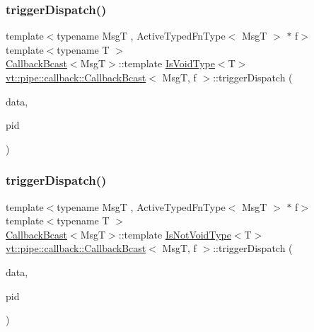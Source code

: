 \subsubsection{\texorpdfstring{trigger\+Dispatch()}{triggerDispatch()}\hspace{0.1cm}{\footnotesize\ttfamily [1/2]}}
{\footnotesize\ttfamily template$<$typename MsgT , Active\+Typed\+Fn\+Type$<$ Msg\+T $>$ $\ast$ f$>$ \\
template$<$typename T $>$ \\
\hyperlink{structvt_1_1pipe_1_1callback_1_1_callback_bcast}{Callback\+Bcast}$<$MsgT$>$\+::template \hyperlink{structvt_1_1pipe_1_1callback_1_1_callback_bcast_a3ca08c23824cfac76b837311a1d2c929}{Is\+Void\+Type}$<$T$>$ \hyperlink{structvt_1_1pipe_1_1callback_1_1_callback_bcast}{vt\+::pipe\+::callback\+::\+Callback\+Bcast}$<$ MsgT, f $>$\+::trigger\+Dispatch (\begin{DoxyParamCaption}\item[{\hyperlink{structvt_1_1pipe_1_1callback_1_1_callback_bcast_aaf994b71056001334d30d74fa9c958f9}{Signal\+Data\+Type} $\ast$}]{data,  }\item[{\hyperlink{namespacevt_ac9852acda74d1896f48f406cd72c7bd3}{Pipe\+Type} const \&}]{pid }\end{DoxyParamCaption})}

\mbox{\label{structvt_1_1pipe_1_1callback_1_1_callback_bcast_aad21dba24d76c98715a077f8e2b885ff}} 
\subsubsection{\texorpdfstring{trigger\+Dispatch()}{triggerDispatch()}\hspace{0.1cm}{\footnotesize\ttfamily [2/2]}}
{\footnotesize\ttfamily template$<$typename MsgT , Active\+Typed\+Fn\+Type$<$ Msg\+T $>$ $\ast$ f$>$ \\
template$<$typename T $>$ \\
\hyperlink{structvt_1_1pipe_1_1callback_1_1_callback_bcast}{Callback\+Bcast}$<$MsgT$>$\+::template \hyperlink{structvt_1_1pipe_1_1callback_1_1_callback_bcast_a3f5efa2edf7f4c47fe047e086e63a477}{Is\+Not\+Void\+Type}$<$T$>$ \hyperlink{structvt_1_1pipe_1_1callback_1_1_callback_bcast}{vt\+::pipe\+::callback\+::\+Callback\+Bcast}$<$ MsgT, f $>$\+::trigger\+Dispatch (\begin{DoxyParamCaption}\item[{\hyperlink{structvt_1_1pipe_1_1callback_1_1_callback_bcast_aaf994b71056001334d30d74fa9c958f9}{Signal\+Data\+Type} $\ast$}]{data,  }\item[{\hyperlink{namespacevt_ac9852acda74d1896f48f406cd72c7bd3}{Pipe\+Type} const \&}]{pid }\end{DoxyParamCaption})}



